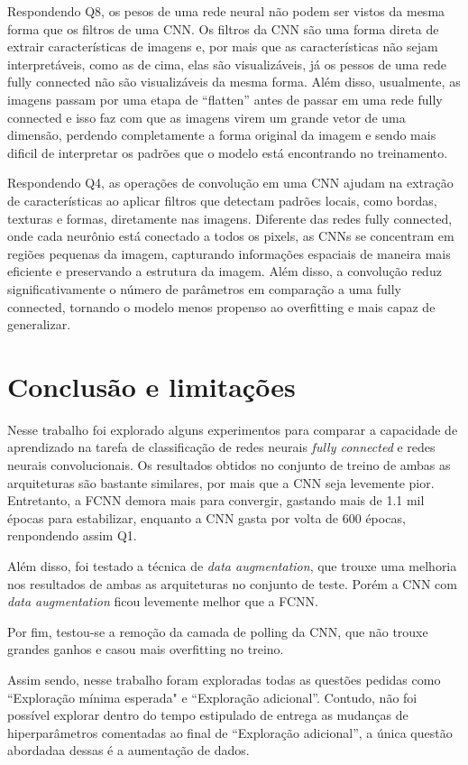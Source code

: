 \documentclass[12pt]{article}
\begin{document}
  Respondendo Q8, os pesos de uma rede neural não podem ser vistos da mesma forma que os filtros de uma CNN. Os filtros da CNN são uma forma direta de extrair características de imagens e, por mais que as características não sejam interpretáveis, como as de cima, elas são visualizáveis, já os pessos de uma rede fully connected não são visualizáveis da mesma forma. Além disso, usualmente, as imagens passam por uma etapa de ``flatten'' antes de passar em uma rede fully connected e isso faz com que as imagens virem um grande vetor de uma dimensão, perdendo completamente a forma original da imagem e sendo mais dificil de interpretar os padrões que o modelo está encontrando no treinamento.

  Respondendo Q4, as operações de convolução em uma CNN ajudam na extração de características ao aplicar filtros que detectam padrões locais, como bordas, texturas e formas, diretamente nas imagens. Diferente das redes fully connected, onde cada neurônio está conectado a todos os pixels, as CNNs se concentram em regiões pequenas da imagem, capturando informações espaciais de maneira mais eficiente e preservando a estrutura da imagem. Além disso, a convolução reduz significativamente o número de parâmetros em comparação a uma fully connected, tornando o modelo menos propenso ao overfitting e mais capaz de generalizar.

\section{Conclusão e limitações}

Nesse trabalho foi explorado alguns experimentos para comparar a capacidade de aprendizado na tarefa de classificação de redes neurais \textit{fully connected} e redes neurais convolucionais. Os resultados obtidos no conjunto de treino de ambas as arquiteturas são bastante similares, por mais que a CNN seja levemente pior. Entretanto, a FCNN demora mais para convergir, gastando mais de 1.1 mil épocas para estabilizar, enquanto a CNN gasta por volta de 600 épocas, renpondendo assim Q1.

Além disso, foi testado a técnica de \textit{data augmentation}, que trouxe uma melhoria nos resultados de ambas as arquiteturas no conjunto de teste. Porém a CNN com \textit{data augmentation} ficou levemente melhor que a FCNN.

Por fim, testou-se a remoção da camada de polling da CNN, que não trouxe grandes ganhos e casou mais overfitting no treino.

Assim sendo, nesse trabalho foram exploradas todas as questões pedidas como ``Exploração mínima esperada" e ``Exploração adicional''. Contudo, não foi possível explorar dentro do tempo estipulado de entrega as mudanças de hiperparâmetros comentadas ao final de ``Exploração adicional'', a única questão abordadaa dessas é a aumentação de dados.




\end{document}
